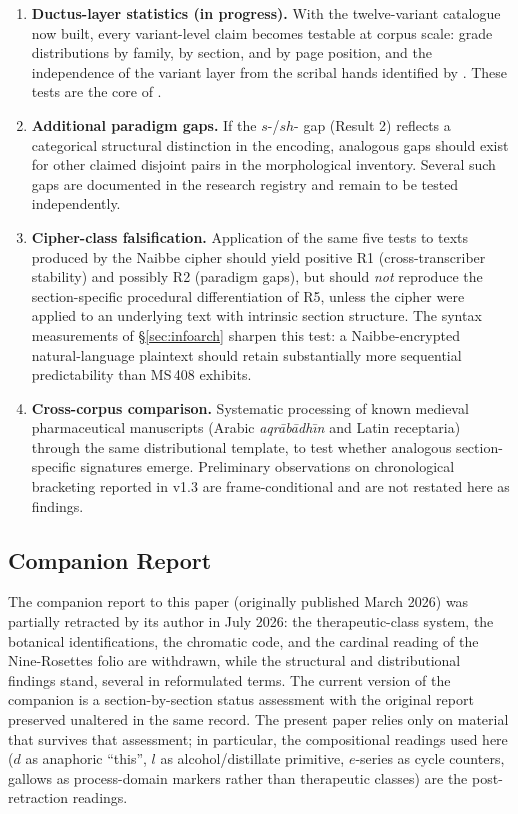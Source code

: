 \documentclass[11pt,a4paper]{article}
\begin{document}
\begin{enumerate}[leftmargin=*,itemsep=4pt]
\item \textbf{Ductus-layer statistics (in progress).} With the twelve-variant catalogue now built, every variant-level claim becomes testable at corpus scale: grade distributions by family, by section, and by page position, and the independence of the variant layer from the scribal hands identified by \citet{Davis2020}. These tests are the core of \citet{Placa2026c}.
\item \textbf{Additional paradigm gaps.} If the $s$-/$sh$- gap (Result 2) reflects a categorical structural distinction in the encoding, analogous gaps should exist for other claimed disjoint pairs in the morphological inventory. Several such gaps are documented in the research registry and remain to be tested independently.
\item \textbf{Cipher-class falsification.} Application of the same five tests to texts produced by the Naibbe cipher \citep{Greshko2025} should yield positive R1 (cross-transcriber stability) and possibly R2 (paradigm gaps), but should \textit{not} reproduce the section-specific procedural differentiation of R5, unless the cipher were applied to an underlying text with intrinsic section structure. The syntax measurements of \S\ref{sec:infoarch} sharpen this test: a Naibbe-encrypted natural-language plaintext should retain substantially more sequential predictability than MS\,408 exhibits.
\item \textbf{Cross-corpus comparison.} Systematic processing of known medieval pharmaceutical manuscripts (Arabic \textit{aqr\=ab\=adh\={\i}n} and Latin receptaria) through the same distributional template, to test whether analogous section-specific signatures emerge. Preliminary observations on chronological bracketing reported in v1.3 are frame-conditional and are not restated here as findings.
\end{enumerate}

\subsection{Companion Report}

The companion report to this paper (originally published March 2026) was partially retracted by its author in July 2026: the therapeutic-class system, the botanical identifications, the chromatic code, and the cardinal reading of the Nine-Rosettes folio are withdrawn, while the structural and distributional findings stand, several in reformulated terms. The current version of the companion is a section-by-section status assessment \citep{Placa2026b} with the original report preserved unaltered in the same record. The present paper relies only on material that survives that assessment; in particular, the compositional readings used here ($d$ as anaphoric ``this'', $l$ as alcohol/distillate primitive, $e$-series as cycle counters, gallows as process-domain markers rather than therapeutic classes) are the post-retraction readings.
\end{document}
